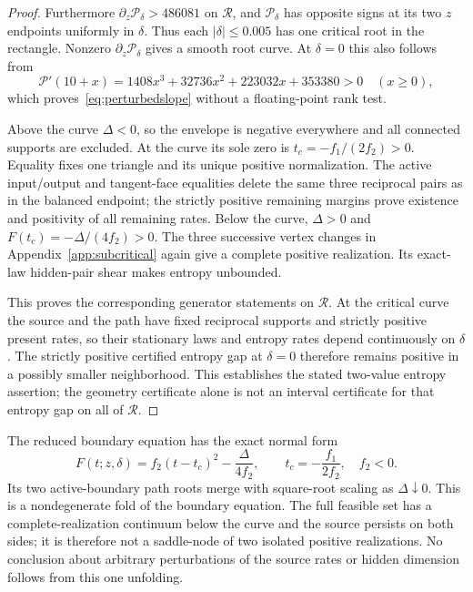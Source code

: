 \begin{proof}
Furthermore $\partial_z\mathcal P_\delta>486081$ on $\mathcal R$, and
$\mathcal P_\delta$ has opposite signs at its two $z$ endpoints uniformly
in $\delta$.  Thus each $|\delta|\le0.005$ has one critical root in the
rectangle.  Nonzero $\partial_z\mathcal P_\delta$ gives a smooth root
curve.  At $\delta=0$ this also follows from
\begin{equation}
 \mathcal P'(10+x)=1408x^3+32736x^2+223032x+353380>0
 \quad(x\ge0),
\end{equation}
which proves~\eqref{eq:perturbedslope} without a floating-point rank test.

Above the curve $\Delta<0$, so the envelope is negative everywhere and
all connected supports are excluded.  At the curve its sole zero is
$t_c=-f_1/(2f_2)>0$.  Equality fixes one triangle and its unique positive
normalization.  The active input/output and tangent-face equalities
delete the same three reciprocal pairs as in the balanced endpoint;
the strictly positive remaining margins prove existence and positivity
of all remaining rates.  Below the curve, $\Delta>0$ and
$F(t_c)=-\Delta/(4f_2)>0$.  The three successive vertex changes in
Appendix~\ref{app:subcritical} again give a complete positive realization.
Its exact-law hidden-pair shear makes entropy unbounded.

This proves the corresponding generator statements on $\mathcal R$.
At the critical curve the source and the path have fixed reciprocal
supports and strictly positive present rates, so their stationary laws
and entropy rates depend continuously on $\delta$.  The strictly positive
certified entropy gap at $\delta=0$ therefore remains positive in a
possibly smaller neighborhood.  This establishes the stated two-value
entropy assertion; the geometry certificate alone is not an interval
certificate for that entropy gap on all of $\mathcal R$.
\end{proof}

The reduced boundary equation has the exact normal form
\begin{equation}
 F(t;z,\delta)=f_2(t-t_c)^2-\frac{\Delta}{4f_2},
 \qquad t_c=-\frac{f_1}{2f_2},\quad f_2<0.\label{eq:foldnormal}
\end{equation}
Its two active-boundary path roots merge with square-root scaling as
$\Delta\downarrow0$.  This is a nondegenerate fold of the boundary
equation.  The full feasible set has a complete-realization continuum
below the curve and the source persists on both sides; it is therefore
not a saddle-node of two isolated positive realizations.  No conclusion
about arbitrary perturbations of the source rates or hidden dimension
follows from this one unfolding.

